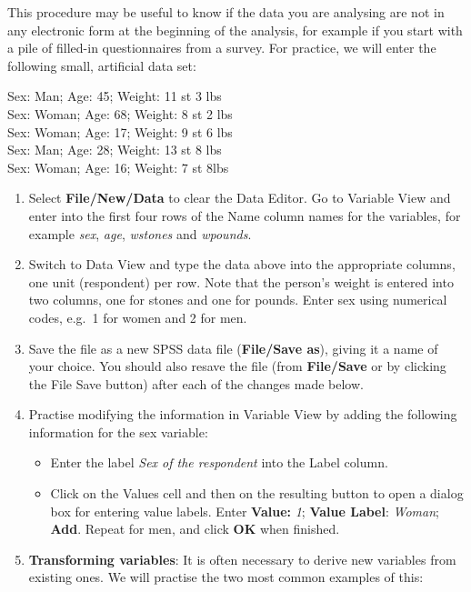 This procedure may be
useful to know if the data you are analysing are not in any electronic
form at the beginning of the analysis,
for example if you start with a pile of filled-in questionnaires from a
survey. For practice, we will enter the following small,
artificial data set:
\begin{center}
Sex: Man; Age: 45; Weight: 11 st 3 lbs\\
Sex: Woman; Age: 68; Weight: 8 st 2 lbs\\
Sex: Woman; Age: 17; Weight: 9 st 6 lbs\\
Sex: Man; Age: 28; Weight: 13 st 8 lbs\\
Sex: Woman; Age: 16; Weight: 7 st 8lbs
\end{center}
\begin{enumerate}
\item
Select \textbf{File/New/Data} to clear the Data Editor. Go to Variable
View and enter into the first four rows of the Name column names for the
variables, for example \emph{sex}, \emph{age}, \emph{wstones} and
\emph{wpounds}.
\item
Switch to Data View and type the data above
into the appropriate columns, one unit (respondent) per
row. Note that the person's weight is entered into two columns, one for
stones and one for pounds. Enter sex using numerical codes, e.g.\ 1 for
women and 2 for men.
\item
Save the file as a new SPSS data file (\textbf{File/Save as}), giving it
a name of your choice.
You should also resave the file (from \textbf{File/Save} or by
clicking the File Save button)
after each of the changes made below.
\item
Practise modifying the information in Variable View by adding
the following information for the sex variable:
\begin{itemize}
\item
Enter the label \emph{Sex of the respondent} into the Label column.
\item
Click on the Values cell and then on the resulting button to open a
dialog box for entering value labels.
Enter \textbf{Value:}
\emph{1}; \textbf{Value Label}: \emph{Woman}; \textbf{Add}. Repeat for
men, and click \textbf{OK} when finished.
\end{itemize}
\item
\textbf{Transforming variables}: It is often necessary to
derive new variables from existing ones.
We will practise the two most common examples of this:
\begin{enumerate}

\end{enumerate}
\end{enumerate}
